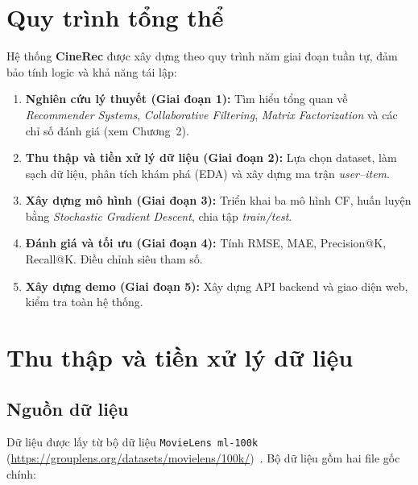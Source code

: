 ﻿\documentclass[../BTL.tex]{subfiles}
\begin{document}

\section{Quy trình tổng thể}
\label{section:3.1}

Hệ thống \textbf{CineRec} được xây dựng theo quy trình năm giai đoạn tuần tự,
đảm bảo tính logic và khả năng tái lập:

\begin{enumerate}[itemsep=0.4em]
    \item \textbf{Nghiên cứu lý thuyết (Giai đoạn 1):} Tìm hiểu tổng quan về
    \textit{Recommender Systems}, \textit{Collaborative Filtering},
    \textit{Matrix Factorization} và các chỉ số đánh giá (xem Chương~2).

    \item \textbf{Thu thập và tiền xử lý dữ liệu (Giai đoạn 2):} Lựa chọn
    dataset, làm sạch dữ liệu, phân tích khám phá (EDA) và xây dựng ma trận
    \textit{user--item}.

    \item \textbf{Xây dựng mô hình (Giai đoạn 3):} Triển khai ba mô hình CF,
    huấn luyện bằng \textit{Stochastic Gradient Descent}, chia tập
    \textit{train/test}.

    \item \textbf{Đánh giá và tối ưu (Giai đoạn 4):} Tính RMSE, MAE,
    Precision@K, Recall@K. Điều chỉnh siêu tham số.

    \item \textbf{Xây dựng demo (Giai đoạn 5):} Xây dựng API backend và giao
    diện web, kiểm tra toàn hệ thống.
\end{enumerate}

\section{Thu thập và tiền xử lý dữ liệu}
\label{section:3.2}

\subsection{Nguồn dữ liệu}
\label{section:3.2.1}

Dữ liệu được lấy từ bộ dữ liệu \texttt{MovieLens ml-100k}
(\url{https://grouplens.org/datasets/movielens/100k/})~\cite{harper2015movielens}.
Bộ dữ liệu gồm hai file gốc chính:
\end{document}
